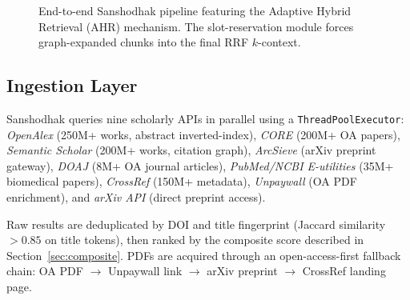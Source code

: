 \documentclass[journal]{IEEEtran}
\begin{document}
\begin{figure}[!t]
{
}
\caption{End-to-end Sanshodhak pipeline featuring the Adaptive Hybrid Retrieval (AHR) mechanism. The slot-reservation module forces graph-expanded chunks into the final RRF $k$-context.}
\label{fig:pipeline}
\end{figure}

\subsection{Ingestion Layer}
Sanshodhak queries nine scholarly APIs in parallel using a
\texttt{ThreadPoolExecutor}:
\textit{OpenAlex} (250M+ works, abstract inverted-index),
\textit{CORE} (200M+ OA papers),
\textit{Semantic Scholar} (200M+ works, citation graph),
\textit{ArcSieve} (arXiv preprint gateway),
\textit{DOAJ} (8M+ OA journal articles),
\textit{PubMed/NCBI E-utilities} (35M+ biomedical papers),
\textit{CrossRef} (150M+ metadata),
\textit{Unpaywall} (OA PDF enrichment),
and \textit{arXiv API} (direct preprint access).

Raw results are deduplicated by DOI and title fingerprint
(Jaccard similarity $>0.85$ on title tokens), then ranked by the
composite score described in Section~\ref{sec:composite}.
PDFs are acquired through an open-access-first fallback chain:
OA PDF $\rightarrow$ Unpaywall link $\rightarrow$ arXiv preprint $\rightarrow$
CrossRef landing page.
\end{document}
